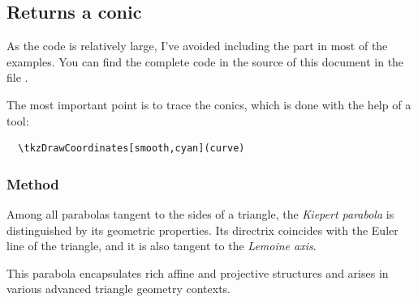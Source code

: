 

\subsection{Returns a conic}

As the code is relatively large, I've avoided including the  part in most of the examples. You can find the complete code in the source of this document in the file .

The most important point is to trace the conics, which is done with the help of a tool:

\begin{mybox}
\begin{verbatim}
  \tkzDrawCoordinates[smooth,cyan](curve)
\end{verbatim}
\end{mybox}

\subsubsection{Method }
\label{ssub:method_triangle_kiepert_parabola}

Among all parabolas tangent to the sides of a triangle, the \emph{Kiepert parabola} is distinguished by its geometric properties. Its directrix coincides with the Euler line of the triangle, and it is also tangent to the \emph{Lemoine axis}.

\medskip

This parabola encapsulates rich affine and projective structures and arises in various advanced triangle geometry contexts.

